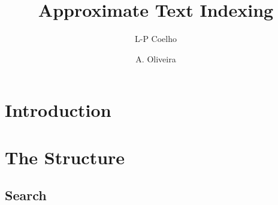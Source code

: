 \documentclass[a4paper,10pt]{article}
\title{Approximate Text Indexing}
\author{L-P Coelho \and A. Oliveira }
\begin{document}
\maketitle

\begin{abstract}

\end{abstract}

\section{Introduction}
\section{The Structure}
\subsection{Search}


\end{document}
